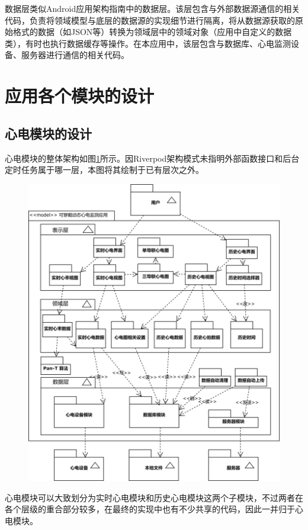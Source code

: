 数据层类似Android应用架构指南中的数据层。该层包含与外部数据源通信的相关代码，负责将领域模型与底层的数据源的实现细节进行隔离，将从数据源获取的原始格式的数据（如JSON等）转换为领域层中的领域对象（应用中自定义的数据类），有时也执行数据缓存等操作。在本应用中，该层包含与数据库、心电监测设备、服务器进行通信的相关代码。


\section{应用各个模块的设计}\label{sec:app-design}

\subsection{心电模块的设计}\label{subsec:ecg-design}

心电模块的整体架构如图\ref{fig:model-ecg}所示。因Riverpod架构模式未指明外部函数接口和后台定时任务属于哪一层，本图将其绘制于已有层次之外。

\begin{figure}[ht]
    \centering
    \includegraphics[width=.8\textwidth]{../assets/model-ecg.drawio}
    \label{fig:model-ecg}
\end{figure}

心电模块可以大致划分为实时心电模块和历史心电模块这两个子模块，不过两者在各个层级的重合部分较多，在最终的实现中也有不少共享的代码，因此一并归于心电模块。

